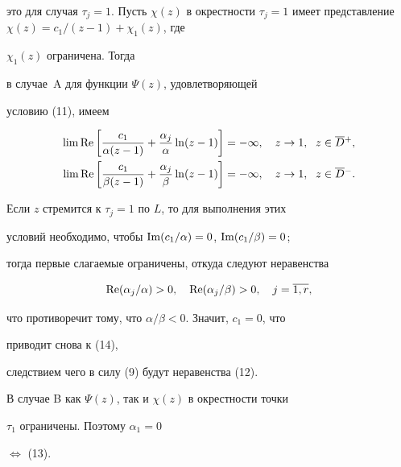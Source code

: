 \begin{pf}
это для случая $\tau_{j} = 1$. Пусть $\chi(z)$ в окрестности $\tau_j


=1$ имеет представление $\chi(z) = c_{1}/(z-1) +\chi_{1}(z)$, где


$\chi_{1}(z)$ ограничена. Тогда


в случае~A для функции $\Psi(z)$, удовлетворяющей


условию (11), имеем


\begin{align*}


\lim\re \bigg[\frac{c_1}{\alpha (z-1)} +


\frac{\alpha_j}{\alpha} \ln(z-1)\bigg] &= -\infty,


\quad z\to 1,\ \; z\in\overline{D}{}^+, \\


%


\lim\re \bigg[\frac{c_1}{\beta(z-1)}+


\frac{\alpha_j}{\beta} \ln(z-1)\bigg]


&= -\infty,\quad z\to 1,\ \; z\in \overline{D}{}^-.


\end{align*}





Если $z$ стремится к $\tau_j = 1$ по $L$, то для выполнения этих


условий необходимо, чтобы $\operatorname{Im}(c_1/\alpha)=0$, $\operatorname{Im}(c_1/\beta)=0$;


тогда первые слагаемые ограничены, откуда следуют неравенства


\begin{equation}


\re (\alpha _{j}/\alpha) > 0,\quad


\re (\alpha _{j}/\beta) > 0,\quad j=\overline{1,r},


\end{equation}


что противоречит тому, что $\alpha/\beta <0$. Значит, $c_{1}=0$, что


приводит снова к (14),


следствием чего в силу (9) будут неравенства (12).





В случае B как $\Psi(z)$, так и $\chi(z)$ в окрестности точки


$\tau_1$ ограничены. Поэтому $\alpha _1 =0$


$\Longleftrightarrow$ (13).


\end{pf}





